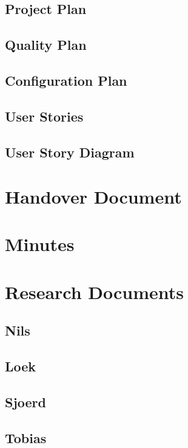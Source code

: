 \section{Project Plan}




\section{Quality Plan}


\section{Configuration Plan}


\section{User Stories}




\section{User Story Diagram}



\chapter{Handover Document}


\chapter{Minutes}

\chapter{Research Documents}

\section{Nils}

\section{Loek}

\section{Sjoerd}

\section{Tobias}
